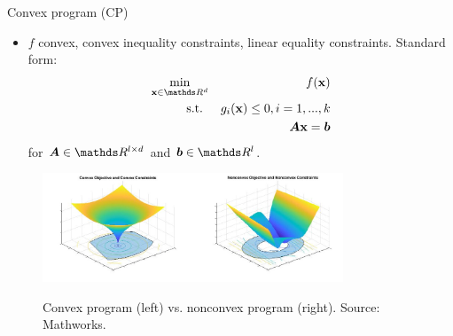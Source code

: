 \documentclass[11pt,compress,t,notes=noshow, xcolor=table]{beamer}
\begin{document}
\begin{vbframe}{Convex program (CP)}

\begin{itemize}
	\item $f$ convex, convex inequality constraints, linear equality constraints. Standard form: 
	\vspace*{-0.2cm}
	\begin{eqnarray*}
	\min_{\xv \in \R^d} && \fx\\
	\text{s.t. } && g_i(\xv) \le 0, i = 1, ..., k \\
	&& \bm{A}\xv = \bm{b}
	\end{eqnarray*}
	for $\bm{A} \in \R^{l \times d}$ and $\bm{b} \in \R^l$. 
\end{itemize}

\begin{figure}
	\includegraphics[width=0.8\textwidth]{figure_man/cp_example.jpg} \\
	\begin{footnotesize}
	Convex program (left) vs. nonconvex program (right). Source: Mathworks.
	\end{footnotesize}
\end{figure}
\vspace*{-0.6cm}




\end{vbframe}
\end{document}
